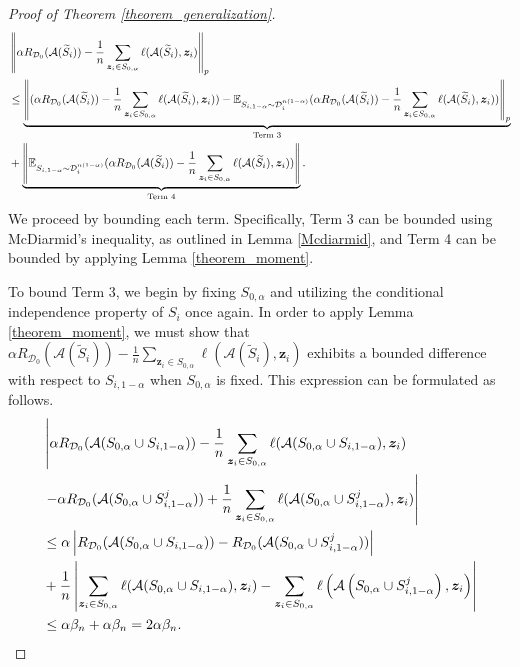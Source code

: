 \begin{proof}[Proof of Theorem \ref{theorem_generalization}]
\begin{align}
&\left\|\alpha R_{\mathcal{D}_0}(\mathcal{A}(\widetilde{S}_i))-\frac{1}{n}\sum_{\boldsymbol{z}_{i}\in S_{0,\alpha}}\ell(\mathcal{A}(\widetilde{S}_i),\boldsymbol{z}_{i})\right\|_p \notag \\
& \leq \underbrace{\left\|(\alpha R_{\mathcal{D}_0}(\mathcal{A}(\widetilde{S}_i))-\frac{1}{n}\sum_{\boldsymbol{z}_{i}\in S_{0,\alpha}}\ell(\mathcal{A}(\widetilde{S}_i),\boldsymbol{z}_{i}))-\mathbb{E}_{S_{i,1-\alpha} \sim \mathcal{D}_i^{n(1-\alpha)}} (\alpha R_{\mathcal{D}_0}(\mathcal{A}(\widetilde{S}_i))-\frac{1}{n}\sum_{\boldsymbol{z}_{i}\in S_{0,\alpha}}\ell(\mathcal{A}(\widetilde{S}_i),\boldsymbol{z}_{i}))\right\|_p}_{\text{Term 3}}\notag\\
&+\underbrace{\left\|\mathbb{E}_{S_{i,1-\alpha} \sim \mathcal{D}_i^{n(1-\alpha)}} (\alpha R_{\mathcal{D}_0}(\mathcal{A}(\widetilde{S}_i))-\frac{1}{n}\sum_{\boldsymbol{z}_{i}\in S_{0,\alpha}}\ell(\mathcal{A}(\widetilde{S}_i),\boldsymbol{z}_{i}))\right\|}_{\text{Term 4}}. \label{proof_34dec}
\end{align}
We proceed by bounding each term. Specifically, Term 3 can be bounded using McDiarmid's inequality, as outlined in Lemma \ref{Mcdiarmid}, and Term 4 can be bounded by applying Lemma \ref{theorem_moment}.

To bound Term 3, we begin by fixing $S_{0, \alpha}$ and utilizing the conditional independence property of $S_i$ once again. In order to apply Lemma \ref{theorem_moment}, we must show that $\alpha R_{\mathcal{D}_0}(\mathcal{A}(\widetilde{S}_i))-\frac{1}{n}\sum_{\boldsymbol{z}_{i}\in S_{0,\alpha}}\ell(\mathcal{A}(\widetilde{S}_i),\boldsymbol{z}_{i})$ exhibits a bounded difference with respect to $S_{i, 1-\alpha}$ when $S_{0, \alpha}$ is fixed. This expression can be formulated as follows.
\begin{align}
&\left|\alpha R_{\mathcal{D}_0}(\mathcal{A}(S_{0,\alpha}\cup S_{i,1-\alpha}))-\frac{1}{n}\sum_{\boldsymbol{z}_{i}\in S_{0,\alpha}}\ell(\mathcal{A}(S_{0,\alpha}\cup S_{i,1-\alpha}),\boldsymbol{z}_{i})\right.\notag\\
&\left.-\alpha R_{\mathcal{D}_0}(\mathcal{A}(S_{0,\alpha}\cup S_{i,1-\alpha}^j))+\frac{1}{n}\sum_{\boldsymbol{z}_{i}\in S_{0,\alpha}} \ell(\mathcal{A}(S_{0,\alpha} \cup S_{i,1-\alpha}^j), \boldsymbol{z}_i)\right| \notag\\
& \leq \alpha\left|R_{\mathcal{D}_0}(\mathcal{A}(S_{0,\alpha}\cup S_{i,1-\alpha}))-R_{\mathcal{D}_0}(\mathcal{A}(S_{0,\alpha}\cup S_{i,1-\alpha}^j))\right| \notag \\
& +\frac{1}{n}\left|\sum_{\boldsymbol{z}_{i}\in S_{0,\alpha}}\ell(\mathcal{A}(S_{0,\alpha}\cup S_{i,1-\alpha}),\boldsymbol{z}_{i})-\sum_{\boldsymbol{z}_{i}\in S_{0,\alpha}} \ell\left(\mathcal{A}\left(S_{0,\alpha} \cup S_{i,1-\alpha}^j\right), \boldsymbol{z}_i\right)\right| \notag \\
&\leq \alpha \beta_{n}+\alpha \beta_{n}=2 \alpha \beta_{n} . \notag
\end{align}


\end{proof}
